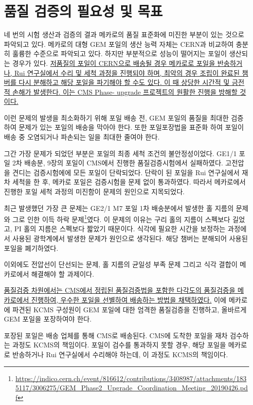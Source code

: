 \section{품질 검증의 필요성 및 목표} 
네 번의 시험 생산과 검증의 결과 메카로의 품질 표준화에 미진한 부분이 있는 것으로 파악되고 있다. 메카로의 대형 GEM 포일의 생산 능력 자체는 CERN과 비교하여 충분히 훌륭한 수준으로 파악되고 있다. 하지만 부분적으로 성능이 떨어지는 포일이 생산되는 경우가 있다. \uline{저품질의 포일이 CERN으로 배송될 경우 메카로로 포일을 반송하거나, Rui 연구실에서 수리 및 세척 과정을 진행되야 하며, 최악의 경우 조립이 완료된 챔버를 다시 분해하고 해당 포일을 파기해야 할 수도 있다. 이 때 상당한 시간적 및 금전적 손해가 발생한다. 이는 CMS Phase- upgrade 프로젝트의 원활한 진행을 방해할 것이다.}

이런 문제의 발생을 최소화하기 위해 포일 배송 전, GEM 포일의 품질을 최대한 검증하여 문제가 있는 포일의 배송을 막아야 한다. 또한 포일포장법을 표준화 하여 포일이 배송 중 오염되거나 파손되는 일을 최대한 줄여야 한다.

그간 가장 문제가 되었던 부분은 포일의 최종 세척 조건의 불안정성이었다. GE1/1 포일 2차 배송분, 9장의 포일이 CMS에서 진행한 품질검증시험에서 실패하였다. 고전압을 견디는 검증시험에에 모든 포일이 단락되었다. 단락이 된 포일을 Rui 연구실에서 재차 세척을 한 후, 메카로 포일은 검증시험을 문제 없이 통과하였다. 따라서 메카로에서 진행한 포일 세척 과정의 미진함이 문제의 원인으로 지목되었다.

최근 발생했던 가장 큰 문제는 GE2/1 M7 포일 1차 배송분에서 발생한 홀 지름의 문제와 그로 인한 이득 하락 문제\footnote{\url{https://indico.cern.ch/event/816612/contributions/3408987/attachments/1835117/3006275/GEM_Phase2_Upgrade_Coordination_Meeting_20190426.pdf}}였다. 이 문제의 이유는 구리 홀의 지름이 스펙보다 길었고, PI 홀의 지름은 스펙보다 짧았기 때문이다. 식각에 필요한 시간을 보정하는 과정에서 사용된 광학계에서 발생한 문제가 원인으로 생각된다. 해당 챔버는 분해되어 사용된 포일을 폐기하였다.     

이외에도 전압선이 단선되는 문제, 홀 지름의 균일성 부족 문제 그리고 식각 결합이 메카로에서 해결해야 할 과제이다.

\uline{품질검증 차원에서는 CMS에서 정립된 품질검증법을 포함한 다각도의 품질검증을 메카로에서 진행하여, 우수한 포일을 선별하여 배송하는 방법을 채택하였다.} 이에 메카로에 파견된 KCMS 구성원이 GEM 포일에 대한 엄격한 품질검증을 진행하고, 올바르게 GEM 포일을 포장하여야 한다.

포장된 포일은 배송 업체를 통해 CMS로 배송된다. CMS에 도착한 포일을 재차 검수하는 과정도 KCMS의 책임이다. 포일이 검수를 통과하지 못할 경우, 해당 포일을 메카로로 반송하거나 Rui 연구실에서 수리해야 하는데, 이 과정도 KCMS의 책임이다.
